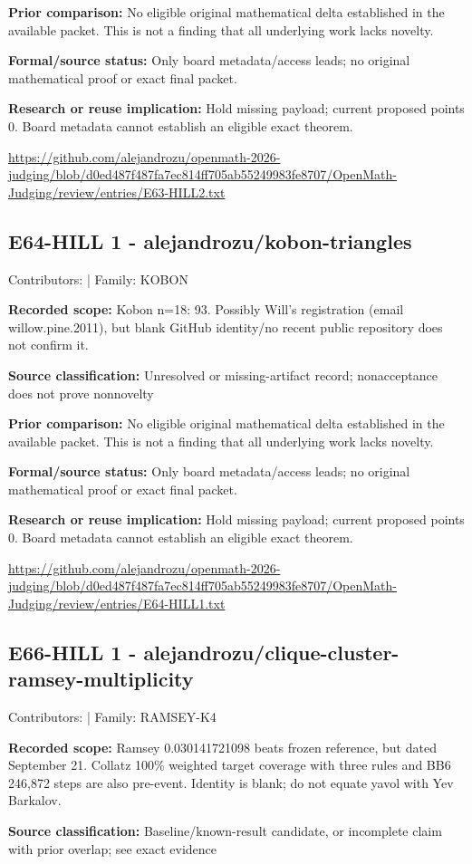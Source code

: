 \documentclass[11pt,a4paper]{article}
\begin{document}
\textbf{Prior comparison:} No eligible original mathematical delta established in the available packet. This is not a finding that all underlying work lacks novelty.

\textbf{Formal/source status:} Only board metadata/access leads; no original mathematical proof or exact final packet. 

\textbf{Research or reuse implication:} Hold missing payload; current proposed points 0. Board metadata cannot establish an eligible exact theorem.

{\small \url{https://github.com/alejandrozu/openmath-2026-judging/blob/d0ed487f487fa7ec814ff705ab55249983fe8707/OpenMath-Judging/review/entries/E63-HILL2.txt}\par}

\begin{samepage}
\subsection{E64-HILL 1  -  alejandrozu/kobon-triangles}
{\small Contributors:  | Family: KOBON\par}

\textbf{Recorded scope:} Kobon n=18: 93. Possibly Will's registration (email willow.pine.2011), but blank GitHub identity/no recent public repository does not confirm it.

\end{samepage}
\textbf{Source classification:} Unresolved or missing-artifact record; nonacceptance does not prove nonnovelty

\textbf{Prior comparison:} No eligible original mathematical delta established in the available packet. This is not a finding that all underlying work lacks novelty.

\textbf{Formal/source status:} Only board metadata/access leads; no original mathematical proof or exact final packet. 

\textbf{Research or reuse implication:} Hold missing payload; current proposed points 0. Board metadata cannot establish an eligible exact theorem.

{\small \url{https://github.com/alejandrozu/openmath-2026-judging/blob/d0ed487f487fa7ec814ff705ab55249983fe8707/OpenMath-Judging/review/entries/E64-HILL1.txt}\par}

\begin{samepage}
\subsection{E66-HILL 1  -  alejandrozu/clique-cluster-ramsey-multiplicity}
{\small Contributors:  | Family: RAMSEY-K4\par}

\textbf{Recorded scope:} Ramsey 0.030141721098 beats frozen reference, but dated September 21. Collatz 100\% weighted target coverage with three rules and BB6 246,872 steps are also pre-event. Identity is blank; do not equate yavol with Yev Barkalov.

\end{samepage}
\textbf{Source classification:} Baseline/known-result candidate, or incomplete claim with prior overlap; see exact evidence
\end{document}
